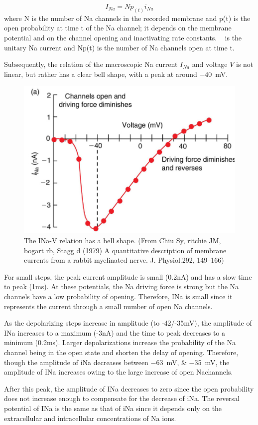 \documentclass[../../Orator]{subfiles}
\begin{document}
\[I_{Na}=N p_{(t)} i_{Na} \]
where N is the number of \gls{Na} channels in the recorded membrane and p(t) is the open probability at time t of the \gls{Na} channel; it depends on the membrane potential and on the channel opening and inactivating rate constants. \unit{\cur\sodium} is the unitary \gls{Na} current and Np(t) is the number of \gls{Na} channels open at time t. 

Subsequently, the relation of the macroscopic \gls{Na} current \(I_{Na}\) and voltage \(V\) is not linear, but rather has a clear bell shape, with a peak at around \qty{-40}{\mV}. 
\begin{figure}[H]
    \centering
    \includegraphics[width=0.5\linewidth]{Pictures//Anakin/I-V.bell.png}
    \caption{The INa-V relation has a bell shape. (From Chiu Sy, ritchie JM, bogart rb, Stagg d (1979) A quantitative description of membrane currents from a rabbit myelinated nerve. J. Physiol.292, 149–166)}
    \label{fig:enter-label}
\end{figure}
 
For small steps, the peak current amplitude is small (0.2nA) and has a slow time to peak (1ms). At these potentials, the \gls{Na} driving force is strong but the \gls{Na} channels have a low probability of opening. Therefore, INa is small since it represents the current through a small number of open \gls{Na} channels. 

As the depolarizing steps increase in amplitude (to -42/-35mV), the amplitude of INa increases to a maximum (-3nA) and the time to peak decreases to a minimum (0.2ms). Larger depolarizations increase the probability of the \gls{Na} channel being in the open state and shorten the delay of opening. Therefore, though the amplitude of iNa decreases between \qtylist{-63;-35}{\mV}, the amplitude of INa increases owing to the large increase of open \gls{Na}channels. 

After this peak, the amplitude of INa decreases to zero since the open probability does not increase enough to compensate for the decrease of iNa. The reversal potential of INa is the same as that of iNa since it depends only on the extracellular and intracellular concentrations of \gls{Na} ions.
\end{document}
